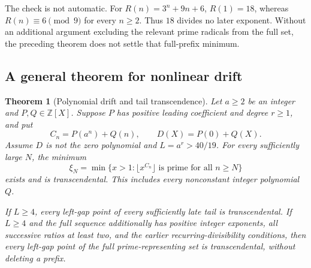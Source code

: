 \documentclass[11pt,a4paper]{article}
\newtheorem{theorem}{Theorem}[section]
\theoremstyle{definition}
\theoremstyle{remark}
\numberwithin{equation}{section}
\begin{document}
The check is not automatic. For $R(n)=3^n+9n+6$, $R(1)=18$, whereas
$R(n)\equiv6\pmod9$ for every $n\ge2$. Thus $18$ divides no later
exponent. Without an additional argument excluding the relevant prime
radicals from the full set, the preceding theorem does not settle that
full-prefix minimum.

\subsection{A general theorem for nonlinear drift}
\begin{theorem}[Polynomial drift and tail transcendence]
\label{mil:thm:nonlinear-drift}
Let $a\ge2$ be an integer and $P,Q\in\mathbb Z[X]$. Suppose $P$ has
positive leading coefficient and degree $r\ge1$, and put
\[
 C_n=P(a^n)+Q(n),\qquad D(X)=P(0)+Q(X).
\]
Assume $D$ is not the zero polynomial and $L=a^r>40/19$.
For every sufficiently large $N$, the minimum
\[
 \xi_N=\min\{x>1:\lfloor x^{C_n}\rfloor\text{ is prime for all }n\ge N\}
\]
exists and is transcendental. This includes every nonconstant integer
polynomial $Q$.

If $L\ge4$, every left-gap point of every sufficiently late tail is
transcendental. If $L\ge4$ and the full sequence additionally has
positive integer exponents, all successive ratios at least two, and the
earlier recurring-divisibility conditions, then every left-gap point of
the full prime-representing set is transcendental, without deleting a prefix.
\end{theorem}
\end{document}
